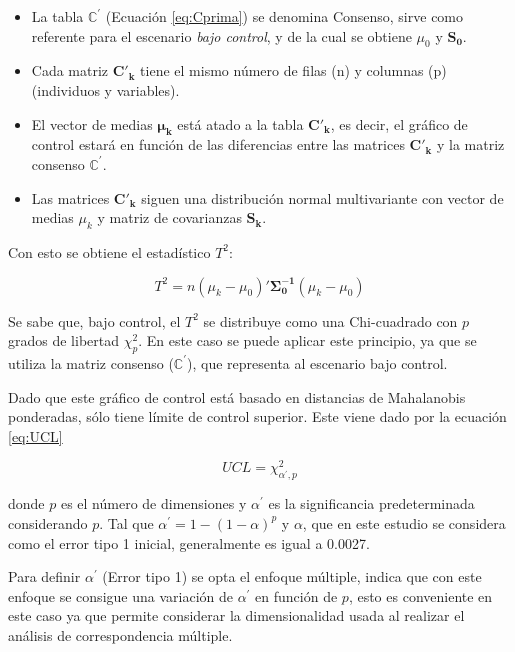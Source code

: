 \documentclass[water,article,submit,moreauthors,pdftex]{mdpi}
\providecommand{\tightlist}{%
  \setlength{\itemsep}{0pt}\setlength{\parskip}{4pt}}
\begin{document}
\begin{itemize}
\tightlist
\item
  La tabla \(\mathbb{C}^{'}\) (Ecuación \ref{eq:Cprima}) se denomina
  Consenso, sirve como referente para el escenario \emph{bajo control},
  y de la cual se obtiene \(\mu_{0}\) y \(\mathbf{S_0}\).\\
\item
  Cada matriz \(\mathbf{C'_k}\) tiene el mismo número de filas (n) y
  columnas (p) (individuos y variables).
\item
  El vector de medias \(\mathbf{\mu_k}\) está atado a la tabla
  \(\mathbf{C'_k}\), es decir, el gráfico de control estará en función
  de las diferencias entre las matrices \(\mathbf{C'_k}\) y la matriz
  consenso \(\mathbf{\mathbb{C^{'}}}\).
\item
  Las matrices \(\mathbf{C'_k}\) siguen una distribución normal
  multivariante con vector de medias \(\mu_{k}\) y matriz de covarianzas
  \(\mathbf{S_k}\).
\end{itemize}

Con esto se obtiene el estadístico \(T^2\):

\begin{equation}
T^2=n (\mu_{k}-\mu_{0})'\mathbf{\Sigma_{0}^{-1}}(\mu_{k}-\mu_{0})
\label{eq:T2}
\end{equation}

Se sabe que, bajo control, el \(T^2\) se distribuye como una
Chi-cuadrado con \(p\) grados de libertad \(\chi^2_p\). En este caso se
puede aplicar este principio, ya que se utiliza la matriz consenso
(\(\mathbb{C}^{'}\)), que representa al escenario bajo control.

Dado que este gráfico de control está basado en distancias de
Mahalanobis ponderadas, sólo tiene límite de control superior. Este
viene dado por la ecuación \ref{eq:UCL}

\begin{equation}
UCL=\chi^2_{\alpha^{'},p}
\label{eq:UCL}
\end{equation}

donde \(p\) es el número de dimensiones y \(\alpha^{'}\) es la
significancia predeterminada considerando \(p\). Tal que
\(\alpha^{'}=1-(1-\alpha)^{p}\) y \(\alpha\), que en este estudio se
considera como el error tipo 1 inicial, generalmente es igual a 0.0027.

Para definir \(\alpha^{'}\) (Error tipo 1) se opta el enfoque múltiple,
\citet{montgomery2012statistical} indica que con este enfoque se
consigue una variación de \(\alpha^{'}\) en función de \(p\), esto es
conveniente en este caso ya que permite considerar la dimensionalidad
usada al realizar el análisis de correspondencia múltiple.
\end{document}

